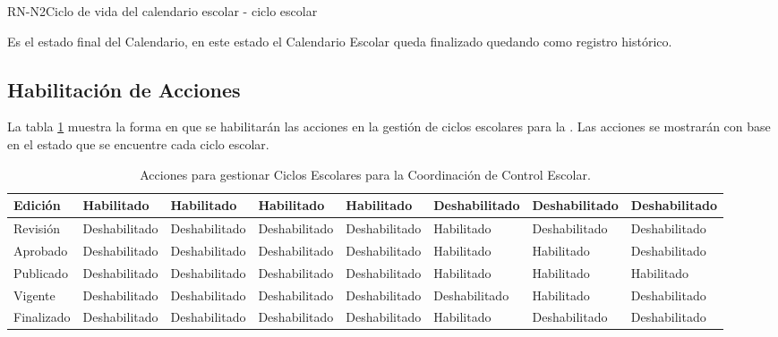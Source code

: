 \begin{BusinessRule}{RN-N2}{Ciclo de vida del calendario escolar - ciclo escolar}
{		 Es el estado final del Calendario, en este estado el Calendario Escolar queda finalizado quedando como registro histórico.
		
	}
	

\subsection{Habilitación de Acciones}
La tabla \ref{tb:iconosCicloEscolarA}  muestra la forma en que se habilitarán las acciones en la gestión de ciclos escolares para la . Las acciones se mostrarán con base en el estado que se encuentre cada ciclo escolar.\\

\begin{table} 
	\begin{center}
		\begin{tabular}{|l|l|l|l|l|l|l|l|}
			\hline
			\hline \hline
			Edición & Habilitado & Habilitado & Habilitado & Habilitado & Deshabilitado & Deshabilitado & Deshabilitado\\ \hline
			Revisión & Deshabilitado & Deshabilitado & Deshabilitado & Deshabilitado & Habilitado & Deshabilitado & Deshabilitado\\ \hline
			Aprobado & Deshabilitado & Deshabilitado & Deshabilitado & Deshabilitado & Habilitado & Habilitado & Deshabilitado\\ \hline
			Publicado & Deshabilitado & Deshabilitado & Deshabilitado & Deshabilitado & Habilitado & Habilitado & Habilitado\\ \hline
			Vigente & Deshabilitado & Deshabilitado & Deshabilitado & Deshabilitado & Deshabilitado & Habilitado & Deshabilitado\\ \hline
			Finalizado & Deshabilitado & Deshabilitado & Deshabilitado & Deshabilitado & Habilitado& Deshabilitado & Deshabilitado\\ \hline
		\end{tabular}
		\caption{Acciones para gestionar Ciclos Escolares para la Coordinación de Control Escolar.}
		\hypertarget{tb:habilitarAcciones}{}
		\label{tb:iconosCicloEscolarA}
	\end{center}
\end{table}



\end{BusinessRule}
